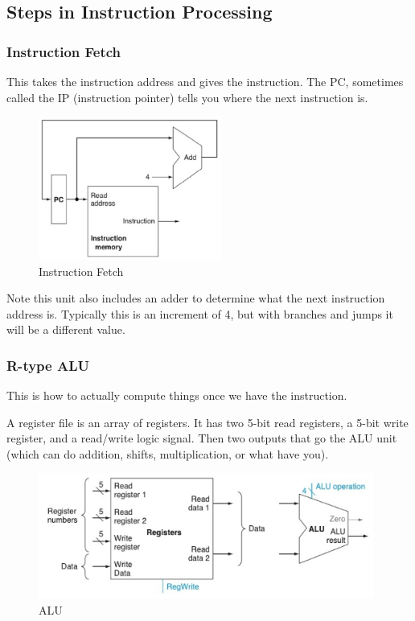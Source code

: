 \documentclass{article}
\begin{document}
\subsection{Steps in Instruction Processing}


\subsubsection{Instruction Fetch} 

This takes the instruction address and gives the instruction. The PC, sometimes called the IP (instruction pointer) tells you where the next instruction is.

\begin{figure}[ht!]
\centering
\includegraphics[width=60mm]{img/InstructionFetch.png}
\caption{Instruction Fetch}
\end{figure}

Note this unit also includes an adder to determine what the next instruction address is. Typically this is an increment of 4, but with branches and jumps it will be a different value.


\subsubsection{R-type ALU}

This is how to actually compute things once we have the instruction.

A register file is an array of registers. It has two 5-bit read registers, a 5-bit write register, and a read/write logic signal. Then two outputs that go the ALU unit (which can do addition, shifts, multiplication, or what have you). 


\begin{figure}[ht!]
\centering
\includegraphics[width=110mm]{img/ALU.png}
\caption{ALU}
\end{figure}
\end{document}
